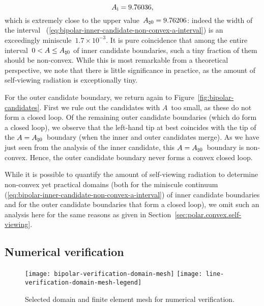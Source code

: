 \begin{equation}
  A_{\mathrm{i}} = 9.76036,
  \label{eq:bipolar-inner-candidate-a-inflection}
\end{equation}
which is extremely close to the upper value~$A_{\natural 0} = 9.76206$:
indeed the width of the interval~%
  (\ref{eq:bipolar-inner-candidate-non-convex-a-interval})
is an exceedingly miniscule~$1.7 \times 10^{-3}$.
It is pure coincidence that
among the entire interval~$0 < A \le A_{\natural 0}$
of inner candidate boundaries,
such a tiny fraction of them should be non-convex.
While this is most remarkable from a theoretical perspective,
we note that there is little significance in practice,
as the amount of self-viewing radiation is exceptionally tiny.

For the outer candidate boundary,
we return again to Figure~\ref{fig:bipolar-candidates}.
First we rule out the candidates with $A$~too small,
as these do not form a closed loop.
Of the remaining outer candidate boundaries
(which do form a closed loop),
we observe that the left-hand tip at best
coincides with the tip of the $A = A_{\natural 0}$~boundary
(when the inner and outer candidates merge).
As we have just seen from the analysis of the inner candidate,
this $A = A_{\natural 0}$~boundary is non-convex.
Hence, the outer candidate boundary
never forms a convex closed loop.

While it is possible to quantify the amount of self-viewing radiation
to determine non-convex yet practical domains
(both for the miniscule continuum~%
  (\ref{eq:bipolar-inner-candidate-non-convex-a-interval})
of inner candidate boundaries
and for the outer candidate boundaries that form a closed loop),
we omit such an analysis here
for the same reasons as given in Section~\ref{sec:polar.convex.self-viewing}.

\subsection{Numerical verification}
\label{sec:bipolar.tracing.verification}

\begin{figure}
  \centering
  \texttt{[image: bipolar-verification-domain-mesh]}
  \texttt{[image: line-verification-domain-mesh-legend]}
  \caption{
    Selected domain and finite element mesh for numerical verification.
  }
  \label{fig:bipolar-verification-domain-mesh}
\end{figure}

\begin{figure}
\end{figure}

